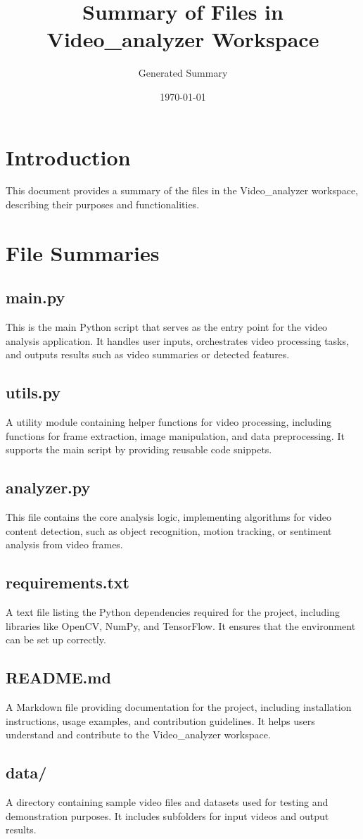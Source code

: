 \documentclass{article}
\title{Summary of Files in Video\_analyzer Workspace}
\author{Generated Summary}
\date{\today}
\begin{document}
\maketitle

\section{Introduction}
This document provides a summary of the files in the Video\_analyzer workspace, describing their purposes and functionalities.

\section{File Summaries}

\subsection{main.py}
This is the main Python script that serves as the entry point for the video analysis application. It handles user inputs, orchestrates video processing tasks, and outputs results such as video summaries or detected features.

\subsection{utils.py}
A utility module containing helper functions for video processing, including functions for frame extraction, image manipulation, and data preprocessing. It supports the main script by providing reusable code snippets.

\subsection{analyzer.py}
This file contains the core analysis logic, implementing algorithms for video content detection, such as object recognition, motion tracking, or sentiment analysis from video frames.

\subsection{requirements.txt}
A text file listing the Python dependencies required for the project, including libraries like OpenCV, NumPy, and TensorFlow. It ensures that the environment can be set up correctly.

\subsection{README.md}
A Markdown file providing documentation for the project, including installation instructions, usage examples, and contribution guidelines. It helps users understand and contribute to the Video\_analyzer workspace.

\subsection{data/}
A directory containing sample video files and datasets used for testing and demonstration purposes. It includes subfolders for input videos and output results.
\end{document}
